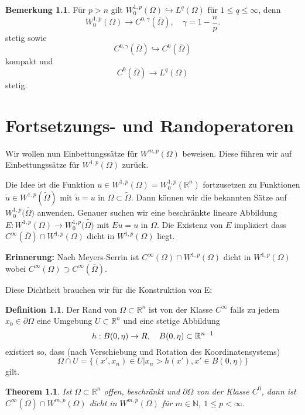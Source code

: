 \documentclass[
paper=a4,
bibtotocnumbered,
liststotocnumbered,
tablecaptionabove,
pointlessnumbers,
twoside,
openright,
10pt
]
{report}
\newtheorem{thm}{Theorem}[chapter]
\theoremstyle{definition}
\newtheorem*{df}{Definition}
\newtheorem*{rem}{Bemerkung}
\numberwithin{equation}{chapter}
\begin{document}
\begin{rem}
 Für $p>n$ gilt $W_0^{1,p}(\Omega) \hookrightarrow L^q(\Omega)$ für $1\le q \le\infty$, denn 
 \begin{equation}
  W_0^{1,p}(\Omega) \to C^{0,\gamma}(\overline{\Omega}), \quad \gamma = 1-\frac{n}{p}.
 \end{equation}
 stetig sowie 
 \begin{equation}
  C^{0,\gamma}(\overline{\Omega}) \hookrightarrow C^0(\overline{\Omega})
 \end{equation}
kompakt und
 \begin{equation}
  C^0(\overline{\Omega}) \to L^q(\Omega)
 \end{equation}
 stetig.
 
 \chapter{Fortsetzungs- und Randoperatoren}

 Wir wollen nun Einbettungssätze für $W^{m,p}(\Omega)$ beweisen. Diese führen wir auf Einbettungssätze für $W^{1,p}(\Omega)$ zurück.  

 Die Idee ist die Funktion $u \in W^{1,p}(\Omega)=W_0^{1,p}(\mathbb{R}^n)$ fortzusetzen zu Funktionen $\tilde{u} \in W^{1,p}(\widetilde{ \Omega})$ mit $\tilde{u }= u$ in $\Omega\subset \widetilde{\Omega}$.   Dann können wir die bekannten Sätze auf $W_0^{1,p}(\widetilde{\Omega)}$ anwenden.   Genauer suchen wir eine beschränkte lineare Abbildung $E: W^{1,p}(\Omega)\to W_0^{1,p}(\widetilde{\Omega)}$ mit $Eu=u$ in $\Omega$.  Die Existenz von $E$ impliziert dass $C^\infty(\overline{\Omega}) \cap W^{1,p}(\Omega)$ dicht in $W^{1,p}(\Omega)$ liegt.
 
 \textbf{Erinnerung:} Nach Meyers-Serrin ist $C^\infty(\Omega) \cap W^{1,p}(\Omega)$ dicht in $W^{1,p}(\Omega)$ wobei $C^\infty(\Omega) \supset C^\infty(\overline{\Omega})$.

Diese Dichtheit brauchen wir für die Konstruktion von E:
\end{rem}

\begin{df}
 Der Rand von $\Omega\subset \mathbb R^n$ ist von der Klasse $C^\infty$ falls zu jedem $x_0 \in \partial \Omega$ eine Umgebung $U\subset \mathbb R^n$ und eine stetige Abbildung
 \begin{equation}
  h: B(0, \eta) \to \mathbb \mathbb{R}, \quad B(0,\eta) \subset \mathbb R^{n-1}
 \end{equation}
existiert so, dass (nach Verschiebung und Rotation des Koordinatensystems)
\begin{equation}
 \Omega \cap U = \{ (x', x_n) \in U| x_n >h(x') , x'\in B(0, \eta)\}
\end{equation}
gilt.
\end{df}
\begin{thm}\label{thm3.9}
 Ist $\Omega \subset \mathbb R^n$ offen, beschränkt und $\partial \Omega$ von der Klasse $C^0$, dann ist $C^\infty(\overline{\Omega}) \cap W^{m,p}(\Omega)$ dicht in $W^{m,p}(\Omega)$ für $m\in \mathbb N$, $1\le p <\infty$.
\end{thm}
\end{document}
